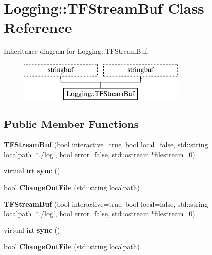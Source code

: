 \hypertarget{classLogging_1_1TFStreamBuf}{\section{Logging\-:\-:T\-F\-Stream\-Buf Class Reference}
\label{classLogging_1_1TFStreamBuf}
}
Inheritance diagram for Logging\-:\-:T\-F\-Stream\-Buf\-:\begin{figure}[H]
\begin{center}
\leavevmode
\includegraphics[height=2.000000cm]{classLogging_1_1TFStreamBuf}
\end{center}
\end{figure}
\subsection*{Public Member Functions}
\begin{DoxyCompactItemize}
\item 
\hypertarget{classLogging_1_1TFStreamBuf_a63cbc5dc23949690321b294670b46243}{{\bfseries T\-F\-Stream\-Buf} (bool interactive=true, bool local=false, std\-::string localpath=\char`\"{}./log\char`\"{}, bool error=false, std\-::ostream $\ast$filestream=0)}\label{classLogging_1_1TFStreamBuf_a63cbc5dc23949690321b294670b46243}

\item 
\hypertarget{classLogging_1_1TFStreamBuf_ac0e2fd3f1ffdc0568dffe1e042d1165e}{virtual int {\bfseries sync} ()}\label{classLogging_1_1TFStreamBuf_ac0e2fd3f1ffdc0568dffe1e042d1165e}

\item 
\hypertarget{classLogging_1_1TFStreamBuf_a68315b3c84362b2eec74a2052f9c54de}{bool {\bfseries Change\-Out\-File} (std\-::string localpath)}\label{classLogging_1_1TFStreamBuf_a68315b3c84362b2eec74a2052f9c54de}

\item 
\hypertarget{classLogging_1_1TFStreamBuf_a63cbc5dc23949690321b294670b46243}{{\bfseries T\-F\-Stream\-Buf} (bool interactive=true, bool local=false, std\-::string localpath=\char`\"{}./log\char`\"{}, bool error=false, std\-::ostream $\ast$filestream=0)}\label{classLogging_1_1TFStreamBuf_a63cbc5dc23949690321b294670b46243}

\item 
\hypertarget{classLogging_1_1TFStreamBuf_a390d8800b83bfd845ba577d37fc26eac}{virtual int {\bfseries sync} ()}\label{classLogging_1_1TFStreamBuf_a390d8800b83bfd845ba577d37fc26eac}

\item 
\hypertarget{classLogging_1_1TFStreamBuf_a68315b3c84362b2eec74a2052f9c54de}{bool {\bfseries Change\-Out\-File} (std\-::string localpath)}\label{classLogging_1_1TFStreamBuf_a68315b3c84362b2eec74a2052f9c54de}

\end{DoxyCompactItemize}
